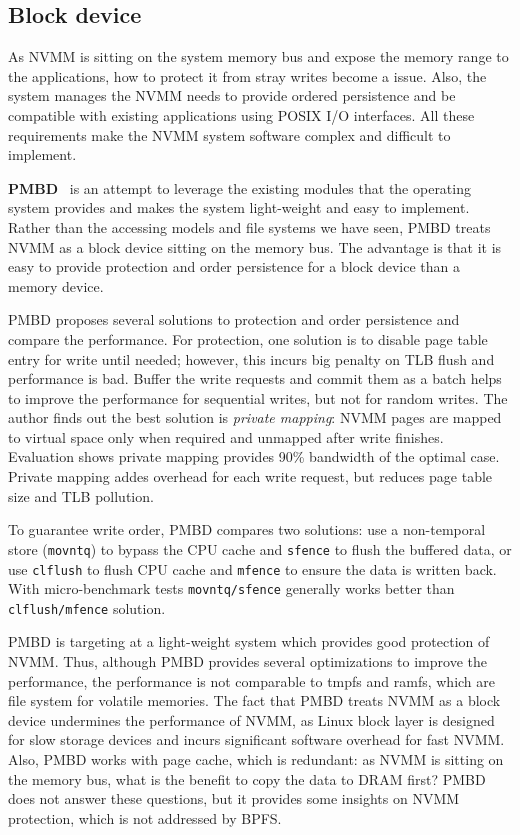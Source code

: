 \subsection{Block device} 
\label{sec:bd}

As NVMM is sitting on the system memory bus and expose the memory range
to the applications, how to protect it from stray writes become a issue.
Also, the system manages the NVMM needs to provide ordered persistence
and be compatible with existing applications using POSIX I/O interfaces.
All these requirements make the NVMM system software complex and difficult
to implement.


\textbf{PMBD}~\cite{PMBD}
 is an attempt to leverage the existing modules that the 
operating system provides and makes the system light-weight and easy to
implement. Rather than the accessing models and file systems we have seen,
PMBD treats NVMM as a block device sitting on the memory bus. The advantage
is that it is easy to provide protection and order persistence for
a block device than a memory device.

PMBD proposes several solutions to protection and order persistence and
compare the performance. For protection, one solution is to disable page
table entry for write until needed; however, this incurs big penalty on
TLB flush and performance is bad. Buffer the write requests and commit
them as a batch helps to improve the performance for sequential writes,
but not for random writes. The author finds out the best solution is 
\emph{private mapping}: NVMM pages are mapped to virtual space only when
required and unmapped after write finishes. Evaluation shows private
mapping provides 90\% bandwidth of the optimal case. Private mapping
addes overhead for each write request, but reduces page table size and
TLB pollution.

To guarantee write order, PMBD compares two solutions: use a non-temporal
store (\texttt{movntq}) to bypass the CPU cache and \texttt{sfence} to
flush the buffered data, or use \texttt{clflush} to flush CPU cache
and \texttt{mfence} to ensure the data is written back. With micro-benchmark
tests \texttt{movntq/sfence} generally works better than \texttt{clflush/mfence}
solution.

PMBD is targeting at a light-weight system which provides good 
protection of NVMM. Thus, although PMBD provides several optimizations
to improve the performance, the performance is not comparable to tmpfs
and ramfs, which are file system for volatile memories. The fact that
PMBD treats NVMM as a block device undermines the performance of NVMM,
as Linux block layer is designed for slow storage devices and incurs
significant software overhead for fast NVMM. Also, PMBD works with page
cache, which is redundant: as NVMM is sitting on the memory bus, what is
the benefit to copy the data to DRAM first? PMBD does not answer these
questions, but it provides some insights on NVMM protection, which is
not addressed by BPFS.

